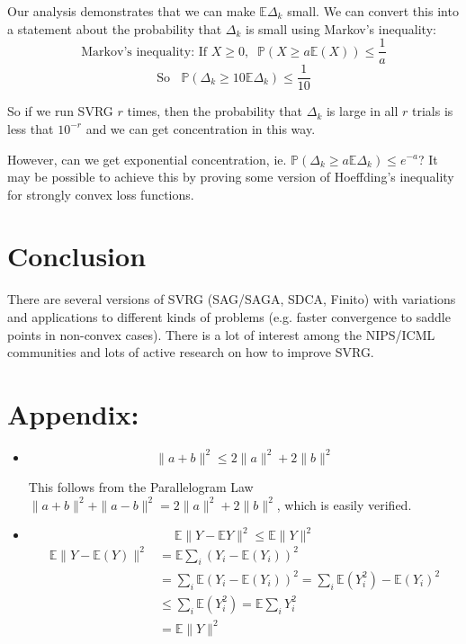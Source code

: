 \documentclass[12pt]{report}
\def \E{\mathbb E}
\def \P{\mathbb P}
\begin{document}
Our analysis demonstrates that we can make $\E \Delta_k$ small. We can convert this into a statement about the probability that $\Delta_k$ is small using Markov's inequality:
 $$\text{Markov's inequality:  If }X\ge 0, \;\; \P(X \ge a\E(X)) \le \frac{1}{a} $$
$$\text{So }\;\;\P(\Delta_k \ge 10\E\Delta_k)  \le \frac{1}{10} $$

So if we run SVRG $r$ times, then the probability that $\Delta_k$ is large in all $r$ trials is less that $10^{-r}$ and we can get concentration in this way.

However, can we get exponential concentration, ie. $\P(\Delta_k \ge a\E\Delta_k) \le e^{-a}$? It may be possible to achieve this by proving some version of Hoeffding's inequality for strongly convex loss functions.

\section{Conclusion}

There are several versions of SVRG (SAG/SAGA, SDCA, Finito) with variations and applications to different kinds of problems (e.g. faster convergence to saddle points in non-convex cases). There is a lot of interest among the NIPS/ICML communities and lots of active research on how to improve SVRG.


\section{Appendix:}
\begin{itemize} 
\item \begin{equation} \label{PL}
\| a+b\|^2 \le 2 \|a\|^2 + 2 \|b\|^2
\end{equation}

This follows from the Parallelogram Law $\|a+b\|^2 + \|a-b\|^2 = 2\|a \|^2 + 2\| b\|^2$, which is easily verified.
 \item \begin{equation} \label{wut}
\E \|Y -\E Y\|^2 \le \E \| Y\|^2
\end{equation}
\begin{align*}
\E \|Y -\E(Y)\|^2 &= \E \sum_i (Y_i - \E(Y_i))^2 \\
&= \sum_i \E (Y_i - \E(Y_i))^2  = \sum_i \E(Y_i^2) -\E (Y_i)^2\\
&  \le  \sum_i \E(Y_i^2) = \E \sum_i Y_i^2 \\
& = \E \|Y \|^2
\end{align*}
\end{itemize}
\end{document}

